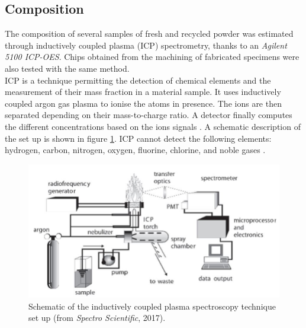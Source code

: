 \subsection{Composition}

The composition of several samples of fresh and recycled powder was estimated through inductively coupled plasma (ICP) spectrometry, thanks to an \textit{Agilent 5100 ICP-OES}. Chips obtained from the machining of fabricated specimens were also tested with the same method.\\

ICP is a technique permitting the detection of chemical elements and the measurement of their mass fraction in a material sample. It uses inductively coupled argon gas plasma to ionise the atoms in presence. The ions are then separated depending on their mass-to-charge ratio. A detector finally computes the different concentrations based on the ions signals \parencite{XRF}. A schematic description of the set up is shown in figure \ref{fig:ICP}. ICP cannot detect the following elements: hydrogen, carbon, nitrogen, oxygen, fluorine, chlorine, and noble gases \parencite{OHSU}.\\

\begin{figure}[ht]
\centering
\includegraphics[scale=0.6]{Images/ICP}
\decoRule
\caption[Schematic of the inductively coupled plasma spectroscopy technique set up.]{Schematic of the inductively coupled plasma spectroscopy technique set up (from \textit{Spectro Scientific}, 2017).}
\label{fig:ICP}
\end{figure}



